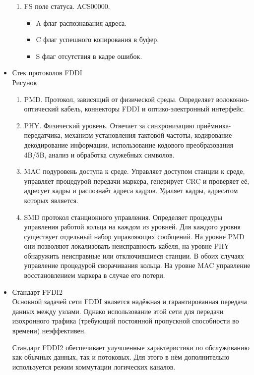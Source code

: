 \documentclass[12pt, russian, oneside, article]{ncc}
\begin{document}
\begin{itemize}
\begin{enumerate}
\item FS поле статуса. ACS00000.

\begin{itemize}
\item A флаг распознавания адреса.
\item C флаг успешного копирования в буфер.
\item S флаг отсутствия в кадре ошибок.
\end{itemize}

\end{enumerate}


\item Стек протоколов FDDI\\
\label{sec-5_2_2_4}%
Рисунок

\begin{enumerate}
\item PMD. Протокол, зависящий от физической среды. Определяет волоконно-оптический кабель, коннекторы FDDI и оптико-электронный интерфейс.
\item PHY. Физический уровень. Отвечает за синхронизацию приёмника-передатчика, механизм установления тактовой частоты, кодирование декодирование информации, использование кодового преобразования 4B/5B, анализ и обработка служебных символов.
\item MAC подуровень доступа к среде. Управляет доступом станции к среде, управляет процедурой передачи маркера, генерирует CRC и проверяет её, адресует кадры и распознаёт адреса кадров. Удаляет кадры, адресатом которых является.
\item SMD протокол станционного управления. Определяет процедуры управления работой кольца на каждом из уровней. Для каждого уровня существует отдельный набор управляющих сообщений. На уровне PMD они позволяют локализовать неисправность кабеля, на уровне PHY обнаружить неисправные или отключившиеся станции. В обоих случаях управление процедурой сворачивания кольца. На уровне MAC управление восстановлением маркера в случае его потери.
\end{enumerate}


\item Стандарт FFDI2\\
\label{sec-5_2_2_5}%
Основной задачей сети FDDI является надёжная и гарантированная передача данных между узлами. Однако использование этой сети для передачи изохронного трафика (требующий постоянной пропускной способности во времени) неэффективен.

Стандарт FDDI2 обеспечивает улучшенные характеристики по обслуживанию как обычных данных, так и потоковых. Для этого в нём дополнительно используется режим коммутации логических каналов.


\end{itemize}
\end{document}
